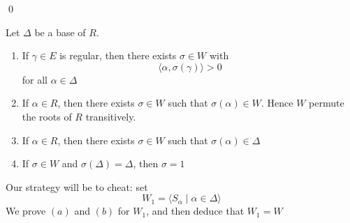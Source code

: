 \documentclass[x11names,reqno,14pt]{extarticle}
\begin{document}
\qed

\thm

Let $\Delta$ be a base of $R$. 

\begin{enumerate}[label=(\alph*)]

\item If $\gamma\in E$ is regular, then there exists $\sigma\in W$ with 
\[
\langle\alpha,\sigma(\gamma)\rangle > 0
\]
for all $\alpha\in\Delta$

\item If $\alpha\in R$, then there exists $\sigma\in W$ such that $\sigma(\alpha)\in W$. Hence $W$ permute the roots of $R$ transitively.

\item If $\alpha\in R$, then there exists $\sigma\in W$ such that $\sigma(\alpha)\in\Delta$

\item If $\sigma\in W$ and $\sigma(\Delta)=\Delta$, then $\sigma = 1$

\end{enumerate}

\proof
Our strategy will be to cheat: set
\[
W_1 = \langle S_\alpha \mid \alpha \in \Delta\rangle
\]
We prove $(a)$ and $(b)$ for $W_1$, and then deduce that $W_1 = W$
\end{document}
